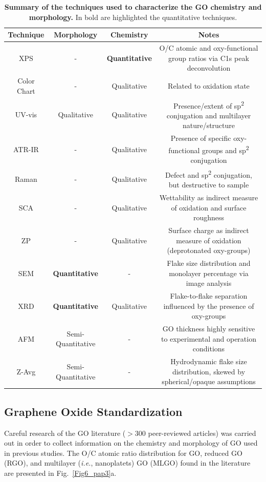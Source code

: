 \begin{table}
 \begin{center}
 \caption{\textbf{Summary of the techniques used to characterize the GO chemistry and morphology.} In bold are highlighted the quantitative techniques.}
  \label{tbl2_pap3}
  \begin{tabular}{cccc}
        \hline
        Technique & Morphology & Chemistry & Notes\\
        \hline
        XPS & - & \textbf{Quantitative} & O/C atomic and oxy-functional group ratios via C1s peak deconvolution\\
        Color Chart & - & Qualitative & Related to oxidation state\\
        UV-vis & Qualitative & Qualitative & Presence/extent of sp\textsuperscript{2} conjugation and multilayer nature/structure\\
        ATR-IR & - & Qualitative & Presence of specific oxy-functional groups and sp\textsuperscript{2} conjugation\\
        Raman & -  & Qualitative & Defect and sp\textsuperscript{2} conjugation, but destructive to sample\\
        SCA & -  & Qualitative & Wettability as indirect measure of oxidation and surface roughness\\
        ZP & - & Qualitative & Surface charge as indirect measure of oxidation (deprotonated oxy-groups)\\
        SEM & \textbf{Quantitative} & -  & Flake size distribution and monolayer percentage via image analysis \\
        XRD & \textbf{Quantitative} & Qualitative  & Flake-to-flake separation influenced by the presence of oxy-groups \\
        AFM & Semi-Quantitative & -  & GO thickness highly sensitive to experimental and operation conditions\\
        Z-Avg & Semi-Quantitative & -  & Hydrodynamic flake size distribution, skewed by spherical/opaque assumptions\\
        \hline
  \end{tabular}
 \end{center}
\end{table}
\subsection{Graphene Oxide Standardization}
Careful research of the GO literature ($>300$ peer-reviewed articles) was carried out in order to collect information on the chemistry and morphology of GO used in previous studies. The O/C atomic ratio distribution for GO, reduced GO (RGO), and multilayer (\textit{i.e.}, nanoplatets) GO (MLGO) found in the literature are presented in Fig.~\ref{Fig6_pap3}a. 

